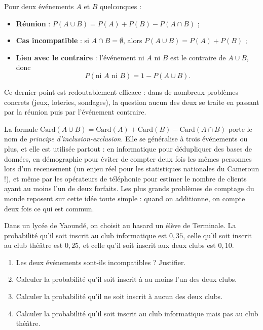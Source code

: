 \documentclass[11pt]{article}
\begin{document}
\begin{aretenir}
Pour deux événements $A$ et $B$ quelconques :
\begin{itemize}
\item \textbf{Réunion} : $P(A \cup B) = P(A) + P(B) - P(A \cap B)$ ;
\item \textbf{Cas incompatible} : si $A \cap B = \emptyset$, alors $P(A \cup B) = P(A) + P(B)$ ;
\item \textbf{Lien avec le contraire} : l'événement \og ni $A$ ni $B$ \fg{} est le contraire de $A \cup B$, donc
\[ P(\text{ni } A \text{ ni } B) = 1 - P(A \cup B). \]
\end{itemize}
Ce dernier point est redoutablement efficace : dans de nombreux problèmes concrets (jeux, loteries, sondages), la question \og aucun des deux \fg{} se traite en passant par la réunion puis par l'événement contraire.
\end{aretenir}

\begin{savaistu}
La formule $\mathrm{Card}(A \cup B) = \mathrm{Card}(A) + \mathrm{Card}(B) - \mathrm{Card}(A \cap B)$ porte le nom de \emph{principe d'inclusion-exclusion}. Elle se généralise à trois événements ou plus, et elle est utilisée partout : en informatique pour dédupliquer des bases de données, en démographie pour éviter de compter deux fois les mêmes personnes lors d'un recensement (un enjeu réel pour les statistiques nationales du Cameroun !), et même par les opérateurs de téléphonie pour estimer le nombre de clients ayant au moins l'un de deux forfaits. Les plus grands problèmes de comptage du monde reposent sur cette idée toute simple : quand on additionne, on compte deux fois ce qui est commun.
\end{savaistu}

\begin{exercice}
Dans un lycée de Yaoundé, on choisit au hasard un élève de Terminale. La probabilité qu'il soit inscrit au club informatique est $0{,}35$, celle qu'il soit inscrit au club théâtre est $0{,}25$, et celle qu'il soit inscrit aux deux clubs est $0{,}10$.
\begin{enumerate}
\item Les deux événements sont-ils incompatibles ? Justifier.
\item Calculer la probabilité qu'il soit inscrit à au moins l'un des deux clubs.
\item Calculer la probabilité qu'il ne soit inscrit à aucun des deux clubs.
\item Calculer la probabilité qu'il soit inscrit au club informatique mais pas au club théâtre.
\end{enumerate}
\end{exercice}
\end{document}
